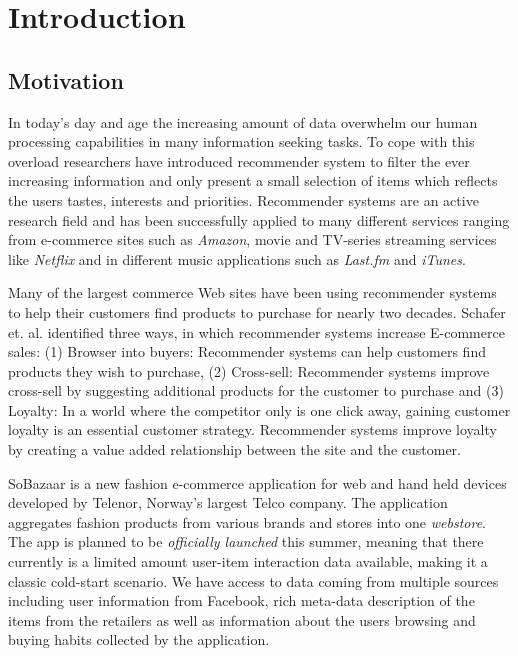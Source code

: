 
\chapter{Introduction}
\minitoc
\setcounter{page}{1}

\clearpage

\section{Motivation}
\label{sec:motivation}


In today's day and age the increasing amount of data overwhelm our human
processing capabilities in many information seeking tasks. To cope with this
overload researchers have introduced recommender system to filter the ever
increasing information and only present a small selection of items which
reflects the users tastes, interests and priorities. Recommender systems are an
active research field and has been successfully applied to many different
services ranging from e-commerce sites such as \emph{Amazon}, movie and
TV-series streaming services like \emph{Netflix} and in different music
applications such as \emph{Last.fm} and \emph{iTunes}.

Many of the largest commerce Web sites have been using recommender systems to
help their customers find products to purchase for nearly two decades.
Schafer et. al. \cite{Schafer1999} identified three ways, in which recommender
systems increase E-commerce sales: (1) Browser into buyers: Recommender systems
can help customers find products they wish to purchase, (2) Cross-sell:
Recommender systems improve cross-sell by suggesting additional products for
the customer to purchase and (3) Loyalty: In a world where the competitor only
is one click away, gaining customer loyalty is an essential customer strategy.
Recommender systems improve loyalty by creating a value added relationship
between the site and the customer.

SoBazaar is a new fashion e-commerce application for web and hand held devices
developed by Telenor, Norway's largest Telco company. The application
aggregates fashion products from various brands and stores into one
\emph{webstore}. The app is planned to be \emph{officially launched} this
summer, meaning that there currently is a limited amount user-item interaction
data available, making it a classic cold-start scenario. We have access to data
coming from multiple sources including user information from Facebook, rich
meta-data description of the items from the retailers as well as information
about the users browsing and buying habits collected by the application.

